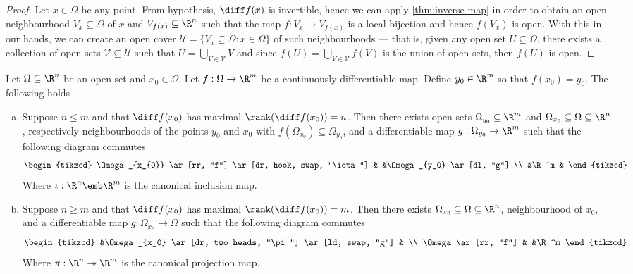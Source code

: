 \begin{proof}
Let \(x \in \Omega\) be any point. From hypothesis, \(\diff f(x)\) is invertible,
hence we can apply \cref{thm:inverse-map} in order to obtain an open
neighbourhood \(V_{x} \subseteq \Omega\) of \(x\) and \(V_{f(x)} \subseteq \R^n\) such that the map
\(f: V_{x} \to V_{f(x)}\) is a local bijection and hence \(f(V_x)\) is
open. With this in our hands, we can create an open cover \(\mathcal U =
\{V_{x} \subseteq \Omega \colon x \in \Omega\}\) of such neighbourhoods --- that is, given any open set
\(U \subseteq \Omega\), there exists a collection of open sets \(\mathcal V \subseteq \mathcal U\)
such that \(U = \bigcup_{V \in \mathcal V} V\) and since \(f(U) = \bigcup_{V \in \mathcal V}
f(V)\) is the union of open sets, then \(f(U)\) is open.
\end{proof}

\begin{theorem}
\label{thm:maximal-rank-theorem}
Let \(\Omega \subseteq \R^n\) be an open set and \(x_0 \in \Omega\). Let \(f: \Omega \to \R^m\) be a
continuously differentiable map. Define \(y_0 \in \R^m\) so that \(f(x_0) =
y_0\). The following holds
\begin{enumerate}[(a).]\setlength\itemsep{0em}
  \item Suppose \(n \leq m\) and that \(\diff f(x_0)\) has maximal
    \(\rank(\diff f(x_{0})) = n\). Then there exists open sets \(\Omega_{y_0} \subseteq
    \R^m\) and \(\Omega_{x_0} \subseteq \Omega \subseteq \R^n\), respectively neighbourhoods of the points
    \(y_0\) and \(x_0\) with \(f(\Omega_{x_0}) \subseteq \Omega_{y_0}\), and a differentiable
    map \(g: \Omega_{y_0} \to \R^m\) such that the following diagram commutes
    \[
      \begin{tikzcd}
        \Omega_{x_{0}} \ar[rr, "f"] \ar[dr, hook, swap, "\iota"]
        & &\Omega_{y_0} \ar[dl, "g"] \\
        &\R^m &
      \end{tikzcd}
    \]
    Where \(\iota: \R^n \emb \R^m\) is the canonical inclusion map.
  \item Suppose \(n \geq m\) and that \(\diff f(x_0)\) has maximal
    \(\rank(\diff f(x_0)) = m\). Then there exists \(\Omega_{x_0} \subseteq \Omega \subseteq \R^n\),
    neighbourhood of \(x_0\), and a differentiable map \(g: \Omega_{x_{0}} \to \Omega\)
    such that the following diagram commutes
    \[
      \begin{tikzcd}
        &\Omega_{x_0} \ar[dr, two heads, "\pi"] \ar[ld, swap, "g"] & \\
        \Omega \ar[rr, "f"] & &\R^m
      \end{tikzcd}
    \]
    Where \(\pi: \R^n \twoheadrightarrow \R^m\) is the canonical projection map.
\end{enumerate}
\end{theorem}

